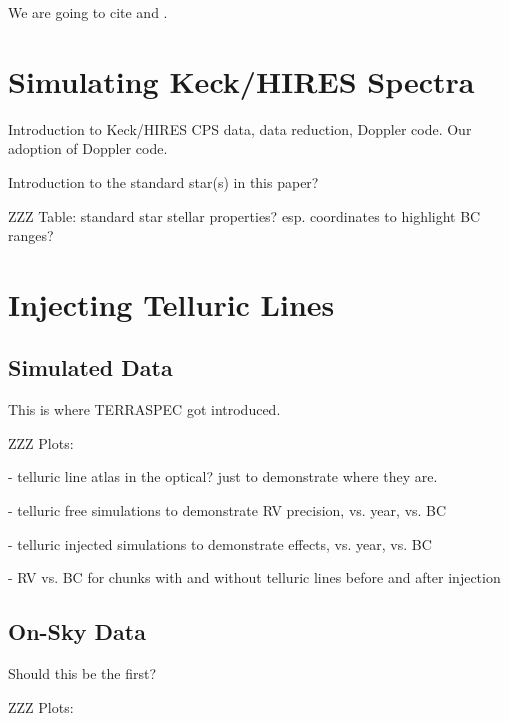 \documentclass{emulateapj}
\begin{document}
\begin{CJK*}{UTF8}{gbsn}
We are going to cite \cite{artigau2014, cunha2014} and \cite{hitran2013}.


\section{Simulating Keck/HIRES Spectra}\label{sec:simulating}

Introduction to Keck/HIRES CPS data, data reduction, Doppler code. Our
adoption of Doppler code.

Introduction to the standard star(s) in this paper?

ZZZ Table: standard star stellar properties? esp. coordinates to
highlight BC ranges?


\section{Injecting Telluric Lines}\label{sec:injecting}


\subsection{Simulated Data}

This is where TERRASPEC got introduced.

ZZZ Plots:

- telluric line atlas in the optical? just to demonstrate where they are.

- telluric free simulations to demonstrate RV precision, vs. year,
vs. BC

- telluric injected simulations to demonstrate effects, vs. year, vs. BC

- RV vs. BC for chunks with and without telluric lines before and
after injection


\subsection{On-Sky Data}

Should this be the first?

ZZZ Plots:


\end{CJK*}
\end{document}
